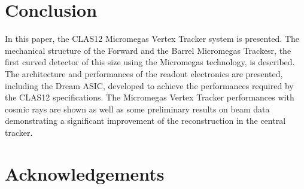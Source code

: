\section{Conclusion}

In this paper, the CLAS12 Micromegas Vertex Tracker system is presented. The mechanical structure of the Forward and the Barrel Micromegas Trackesr, the first curved detector of this size using the Micromegas technology, is described. The architecture and performances of the readout electronics are presented, including the Dream ASIC, developed to achieve the performances required by the CLAS12 specifications. The Micromegas Vertex Tracker performances with cosmic rays are shown as well as some preliminary results on beam data demonstrating a significant improvement of the reconstruction in the central tracker.

\section{Acknowledgements}


